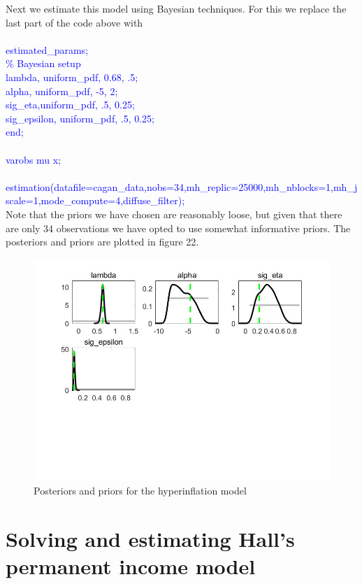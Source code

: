 \documentclass[a4paper,12pt]{scrartcl} %
\begin{document}
\vspace{4cm}

Next we estimate this model using Bayesian techniques. For this we replace the last part of the code above with\\
\\
\textcolor{blue}{
estimated\_params;\\
\% Bayesian setup\\
lambda, uniform\_pdf, 0.68, .5;\\
alpha, uniform\_pdf, -5, 2;\\
sig\_eta,uniform\_pdf, .5, 0.25;\\
sig\_epsilon, uniform\_pdf, .5, 0.25;\\
end;\\
\\
varobs mu x;\\
\\
estimation(datafile=cagan\_data,nobs=34,mh\_replic=25000,mh\_nblocks=1,mh\_jscale=1,mode\_compute=4,diffuse\_filter);}\\

Note that the priors we have chosen are reasonably loose, but given that there are only 34 observations we have opted to use somewhat informative priors. The posteriors and priors are plotted in figure 22.

\begin{figure}[htbp!]
		\centering
			\includegraphics[width=0.8\linewidth]{fig22.jpg}
            \caption{Posteriors and priors for the hyperinflation model}\label{22}
\end{figure}



\section{Solving and estimating Hall’s permanent income model}
\end{document}
